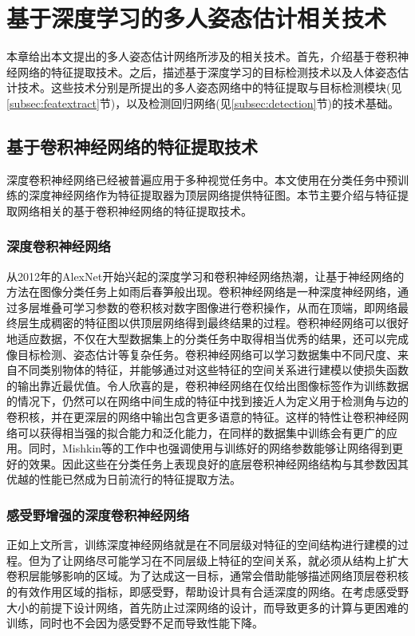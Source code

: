 \chapter{基于深度学习的多人姿态估计相关技术}
\label{cha:basicfacts}
本章给出本文提出的多人姿态估计网络所涉及的相关技术。首先，介绍基于卷积神经网络的特征提取技术。之后，描述基于深度学习的目标检测技术以及人体姿态估计技术。这些技术分别是所提出的多人姿态网络中的特征提取与目标检测模块(见\ref{subsec:featextract}节)，以及检测回归网络(见\ref{subsec:detection}节)的技术基础。
\section{基于卷积神经网络的特征提取技术}
深度卷积神经网络已经被普遍应用于多种视觉任务中。本文使用在分类任务中预训练的深度神经网络作为特征提取器为顶层网络提供特征图。本节主要介绍与特征提取网络相关的基于卷积神经网络的特征提取技术。
\subsection{深度卷积神经网络}
\label{subsec:factsfeature}
从2012年的AlexNet\cite{alex2012alexnet}开始兴起的深度学习和卷积神经网络热潮，让基于神经网络的方法在图像分类任务上如雨后春笋般出现。卷积神经网络是一种深度神经网络，通过多层堆叠可学习参数的卷积核对数字图像进行卷积操作，从而在顶端，即网络最终层生成稠密的特征图以供顶层网络得到最终结果的过程。卷积神经网络可以很好地适应数据，不仅在大型数据集上的分类任务中取得相当优秀的结果\cite{simonyan2014very}，还可以完成像目标检测、姿态估计等复杂任务。卷积神经网络可以学习数据集中不同尺度、来自不同类别物体的特征，并能够通过对这些特征的空间关系进行建模以使损失函数的输出靠近最优值。令人欣喜的是，卷积神经网络在仅给出图像标签作为训练数据的情况下，仍然可以在网络中间生成的特征中找到接近人为定义用于检测角与边的卷积核，并在更深层的网络中输出包含更多语意的特征\cite{yosinski2015understanding}。这样的特性让卷积神经网络可以获得相当强的拟合能力和泛化能力，在同样的数据集中训练会有更广的应用。同时，Mishkin等的工作中\cite{mishkin2015all}也强调使用与训练好的网络参数能够让网络得到更好的效果。因此这些在分类任务上表现良好的底层卷积神经网络结构与其参数因其优越的性能已然成为日前流行的特征提取方法。
\subsection{感受野增强的深度卷积神经网络}
\label{subsec:factsdeepextract}
正如上文所言，训练深度神经网络就是在不同层级对特征的空间结构进行建模的过程。但为了让网络尽可能学习在不同层级上特征的空间关系，就必须从结构上扩大卷积层能够影响的区域。为了达成这一目标，通常会借助能够描述网络顶层卷积核的有效作用区域的指标，即感受野，帮助设计具有合适深度的网络。在考虑感受野大小的前提下设计网络，首先防止过深网络的设计，而导致更多的计算与更困难的训练，同时也不会因为感受野不足而导致性能下降。

